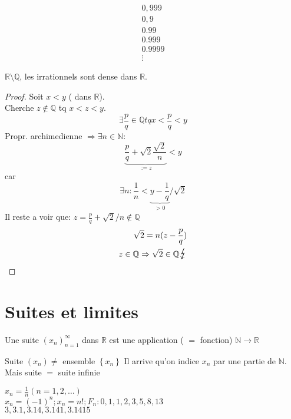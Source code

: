 \documentclass[../main.tex]{subfiles}
\begin{document}
\begin{align*}
0,999\\
0,9\\
0.99\\
0.999\\
0.9999\\
\vdots
\end{align*}
\begin{propo}\label{propo:densite_des_irrationnels}
	$\mathbb{R} \setminus \mathbb{Q}$, les irrationnels sont dense dans $\mathbb{R}$.
\end{propo}
\begin{proof}
	Soit $x<y$ ( dans $\mathbb{R}$).\\
	Cherche $z \notin \mathbb{Q}$ tq $x<z<y$.\\
	\[ 
	\exists \frac{p}{q} \in \mathbb{Q} tq x< \frac{p}{q} <y
	\]
	Propr. archimedienne $  \Rightarrow \exists n \in \mathbb{N}$:
	\[ 
		\underbrace{\frac{p}{q} + \sqrt{2} \frac{\sqrt{2}}{n}}_{:=z} <y
	\]
	car 
	\[ 
		\exists n: \frac{1}{n} < \underbrace{y - \frac{1}{q}}_{>0} / \sqrt{2}
	\]
	Il reste a voir que: $z= \frac{p}{q} + \sqrt{2}/n \notin \mathbb{Q}$ 
	\begin{align*}
	\sqrt{2} = n ( z-\frac{p}{q})\\
	z \in \mathbb{Q} \Rightarrow \sqrt 2 \in \mathbb{Q} \contra
	\end{align*}
\end{proof}
\section{Suites et limites}
\begin{defn}[Suite]\label{defn:suite}
	Une suite $(x_n)_{n=1}^{\infty }$ dans $\mathbb{R}$
	est une application ( $=$ fonction) $\mathbb{N}\to \mathbb{R}$
\end{defn}
\begin{rmq}
	Suite $(x_n) \neq$ ensemble $ \left\{ x_n \right\} $
	 Il arrive qu'on indice $x_n$ par une partie de $\mathbb{N}$.
	 Mais suite $=$ suite infinie
\end{rmq}
\begin{exemple}
	$x_n = \frac{1}{n} ( n=1,2,\ldots)$ \\
	$x_n = ( -1)^{n}; x_n = n!; F_n:0,1,1,2,3,5,8,13$\\
	$3,3.1,3.14,3.141,3.1415$
\end{exemple}
\hr
\end{document}
